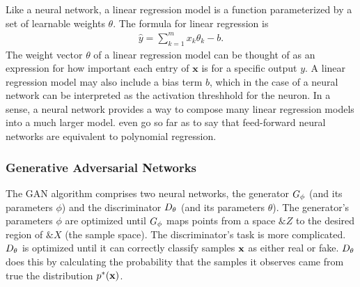 Like a neural network, a linear regression model is a function
parameterized by a set of learnable weights $\theta$. The formula for
linear regression is
\begin{align}
  \label{eq:lin-reg} \hat{y} = \sum_{k=1}^m x_k\theta_k - b.
\end{align} The weight vector $\theta$ of a linear regression model
can be thought of as an expression for how important each entry of
$\mathbf{x}$ is for a specific output $y$. A linear regression model
may also include a bias term $b$, which in the case of a neural
network can be interpreted as the activation threshhold for the
neuron. In a sense, a neural network provides a way to compose many
linear regression models into a much larger
model. \cite{ref:cheng-2018} even go so far as to say that
feed-forward neural networks are equivalent to polynomial regression.

\subsubsection*{Generative Adversarial Networks}

The GAN algorithm comprises two neural networks, the generator $G_\phi$
(and its parameters $\phi$) and the discriminator $D_\theta$ (and its
parameters $\theta$). The generator's parameters $\phi$ are optimized
until $G_\phi$ maps points from a space $\&Z$ to the desired region of
$\&X$ (the sample space). The discriminator's task is more
complicated. $D_\theta$ is optimized until it can correctly classify samples
$\mathbf{x}$ as either real or fake. $D_\theta$ does this by calculating the
probability that the samples it observes came from true the
distribution $p^*(\mathbf{x})$.

